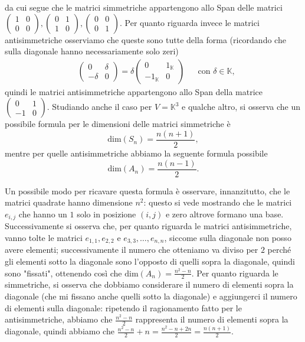 da cui segue che le matrici simmetriche appartengono allo Span delle matrici $\begin{pmatrix} 1 & 0 \\ 0 & 0 \end{pmatrix}, \begin{pmatrix} 0 & 1 \\ 1 & 0 \end{pmatrix}, \begin{pmatrix} 0 & 0 \\ 0 & 1 \end{pmatrix}$. Per quanto riguarda invece le matrici antisimmetriche
osserviamo che queste sono tutte della forma (ricordando che sulla diagonale hanno necessariamente solo zeri)
\begin{align}
  &\begin{pmatrix}
    0 & \delta \\
    -\delta & 0
  \end{pmatrix} = \delta \begin{pmatrix} 0 & 1_{\mathbb{K}} \\ -1_\mathbb{K} & 0 \end{pmatrix} & &\text{con } \delta \in \mathbb{K},
\end{align}
quindi le matrici antisimmetriche appartengono allo Span della matrice $\begin{pmatrix} 0 & 1 \\ -1 & 0 \end{pmatrix}$. Studiando anche il caso per $V=\mathbb{K}^3$ e qualche altro, si osserva che un possibile formula per le dimensioni delle matrici simmetriche è
\begin{equation}
  \label{eq:dim_simm}
  \text{dim}(S_n) = \frac{n(n+1)}{2},
\end{equation}
mentre per quelle antisimmetriche abbiamo la seguente formula possibile
\begin{equation}
  \label{eq:dim_antisimm}
  \text{dim}(A_n) = \frac{n(n-1)}{2}.
\end{equation}
\begin{remark}
  Un possibile modo per ricavare questa formula è osservare, innanzitutto, che le matrici quadrate hanno dimensione $n^2$: questo si vede mostrando che le matrici $e_{i,j}$ che hanno un $1$ solo in posizione $(i,j)$ e zero altrove formano una base. Successivamente si osserva che, per quanto riguarda le matrici antisimmetriche, vanno tolte le matrici $e_{1, 1}, e_{2, 2}$ e $e_{3, 3}, \ldots, e_{n, n}$, siccome sulla diagonale non posso avere elementi; successivamente il numero che otteniamo
  va diviso per $2$ perché gli elementi sotto la diagonale sono l'opposto di quelli sopra la diagonale, quindi sono "fissati", ottenendo così che $\text{dim}(A_n) = \frac{n^2-n}{2}$. Per quanto riguarda le simmetriche, si osserva che dobbiamo considerare il numero di elementi sopra la diagonale (che mi fissano anche quelli sotto la diagonale) e aggiungerci il numero di elementi sulla diagonale: ripetendo il ragionamento fatto per le antisimmetriche, abbiamo che $\frac{n^2-n}{2}$ rappresenta il numero di elementi
  sopra la diagonale, quindi abbiamo che $\frac{n^2 - n}{2} + n = \frac{n^2 - n +2n}{2} = \frac{n(n+1)}{2}$.
\end{remark}
